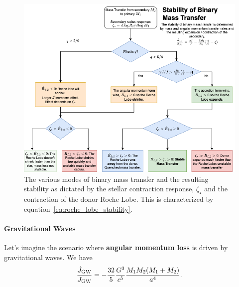 \begin{figure}[ht!]
    \centering
    \includegraphics[width=1\linewidth]{Pictures/figures/binary_mass_accretion.png}
    \caption{The various modes of binary mass transfer and the resulting stability as dictated by the stellar contraction response, $\zeta_\star$ and the contraction of the donor Roche Lobe. This is characterized by equation~\eqref{eq:roche_lobe_stability}.}
    \label{fig:roche_transfer_stability}
\end{figure}
\paragraph{Gravitational Waves}
Let's imagine the scenario where \textbf{angular momentum loss} is driven by gravitational waves. We have
    \[
    \frac{\dot{J}_{\rm GW}}{J_{\rm GW}} = -\frac{32}{5}\frac{G^{3}}{c^5}
        \frac{M_1M_2(M_1 + M_2)}{a^{4}}.
        \]

